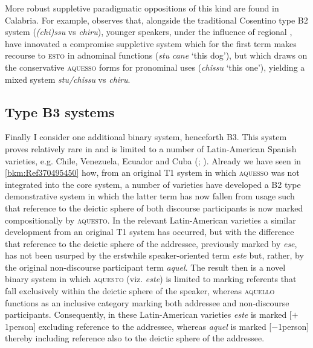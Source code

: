 \documentclass[output=paper]{langsci/langscibook}
\begin{document}
More robust suppletive paradigmatic oppositions of this kind are found in
Calabria. For example, \citet[107]{ledgeway2004sviluppo} observes that,
alongside the traditional Cosentino type B\textsc{2}\textsc{} system
(\emph{(chi)ssu} vs \emph{chiru}), younger speakers, under the influence of
regional , have innovated a compromise suppletive system which for the
first term makes recourse to \textsc{esto} in adnominal functions (\emph{stu}
\emph{cane} ‘this dog’), but which draws on the conservative \textsc{aquesso}
forms for pronominal uses (\emph{chissu} ‘this one’), yielding a mixed system
\emph{stu/chissu} vs \emph{chiru}.

\subsection{Type B3 systems}

Finally I consider one additional binary system, henceforth B3. This system\linebreak
proves relatively rare in  and is limited to a number of Latin-American
Spanish varieties, e.g. Chile, Venezuela, Ecuador and Cuba
(\citealt[434]{Zamora-Vicente:1967a}; \citealt[171]{Bruyne:1995a}). Already we
have seen in \cref{bkm:Ref370495450} how, from an original T1 system in which
\textsc{aquesso} was not integrated into the core system, a number of 
varieties have developed a B2 type demonstrative system in which the
latter term has now fallen from usage such that reference to the deictic sphere
of both discourse participants is now marked compositionally by
\textsc{aquesto}. In the relevant Latin-American  varieties a similar
development from an original T1 system has occurred, but with the difference
that reference to the deictic sphere of the addressee, previously marked by
\emph{ese}, has not been usurped by the erstwhile speaker-oriented term
\emph{este} but, rather, by the original non-discourse participant term
\emph{aquel}. The result then is a novel binary system in which
\textsc{aquesto} (viz. \emph{este}) is limited to marking referents that fall
exclusively within the deictic sphere of the speaker, whereas \textsc{aquello}
functions as an inclusive category marking both addressee and non-discourse
participants. Consequently, in these Latin-American varieties \emph{este} is
marked [$+$1person] excluding reference to the addressee, whereas \emph{aquel} is
marked [$-$1person] thereby including reference also to the deictic sphere of the
addressee.
\end{document}
